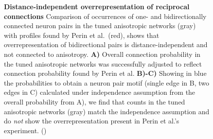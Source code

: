 \begin{figure}[htp]
  \centering
  \vspace{-0.6cm}
  \captionsetup{skip=7pt}
  \caption{\textbf{Distance-independent overrepresentation of
      reciprocal connections} Comparison of occurrences of one- and
    bidirectionally connected neuron pairs in the tuned anisotropic
    networks (gray) with profiles found by Perin et al.~(red), shows
    that overrepresentation of bidirectional pairs is
    distance-independent and not connected to anisotropy.  \textbf{A)}
    Overall connection probability in the tuned anisotropic networks
    was successfully adjusted to reflect connection probability found
    by Perin et al. \textbf{B)-C)} Showing in blue the probabilities
    to obtain a neuron pair motif (single edge in B, two edges in C)
    calculated under independence assumption from the overall
    probability from A), we find that counts in the tuned anisotropic
    networks (gray) match the independence assumption and do
    \textit{not} show the overrepresentation present in Perin et al.'s
    experiment. ()}
  \label{fig:perin_profiles}
\end{figure}







